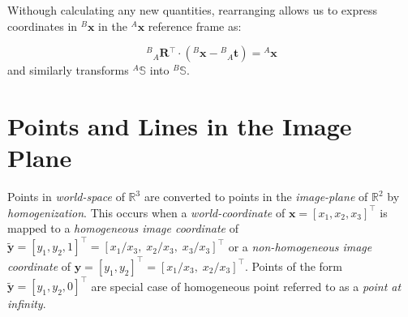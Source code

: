 \documentclass{report}
\newcommand{\tR}[0]{\ensuremath{^{A}}}
\newcommand{\bR}[0]{\ensuremath{_{A}}}
\newcommand{\tL}[0]{\ensuremath{^{B}}}
\newcommand{\tT}[0]{\ensuremath{^{\intercal}}}
\newcommand{\xL}[0]{\ensuremath{{\tL\mathbf{x}}}}
\newcommand{\xR}[0]{\ensuremath{{\tR\mathbf{x}}}}
\newcommand{\rLR}[0]{\ensuremath{{\tL\bR}\mathbf{R}}}
\newcommand{\rLt}[0]{\ensuremath{{\tL\bR}\mathbf{t}}}
\newcommand{\sR}[0]{\ensuremath{^{A}\mathbb{S}}}
\newcommand{\sL}[0]{\ensuremath{^{B}\mathbb{S}}}
\begin{document}
\par Withough calculating any new quantities, rearranging allows us to express coordinates in $\xL$ in the $\xR$ reference frame as:

\par \begin{equation*}
	{\rLR\tT}\cdot (\xL - \rLt ) = \xR
\end{equation*}
and similarly transforms $\sR$ into $\sL$.

\section{Points and Lines in the Image Plane}

\par Points in \textit{world-space} of $\mathbb{R}^3$ are converted to points in the \textit{image-plane} of $\mathbb{R}^2$ by \textit{homogenization}. This occurs when a \textit{world-coordinate} of $\mathbf{x}=[x_1,x_2,x_3]^\intercal$ is mapped to a \textit{homogeneous image coordinate} of $\mathbf{\tilde{y}}=[y_1,y_2,1]^\intercal=[x_1/x_3,\;x_2/x_3,\;x_3/x_3]^\intercal$ or a \textit{non-homogeneous image coordinate} of $\mathbf{y}=[y_1,y_2]^\intercal=[x_1/x_3,\;x_2/x_3]^\intercal$. Points of the form $\mathbf{\tilde{y}}=[y_1,y_2,0]^\intercal$ are special case of homogeneous point referred to as a \textit{point at infinity}.
\end{document}
